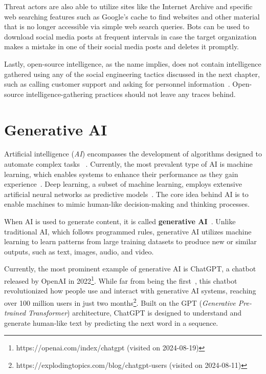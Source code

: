 Threat actors are also able to utilize sites like the Internet Archive and specific web searching features such as Google’s cache to find websites and other material that is no longer accessible via simple web search queries. Bots can be used to download social media posts at frequent intervals in case the target organization makes a mistake in one of their social media posts and deletes it promptly.

Lastly, open-source intelligence, as the name implies, does not contain intelligence gathered using any of the social engineering tactics discussed in the next chapter, such as calling customer support and asking for personnel information~\citep{hadnagy_Social_Engineering_The_Science_2018}. Open-source intelligence-gathering practices should not leave any traces behind.





\section{Generative AI}

Artificial intelligence (\textit{AI}) encompasses the development of algorithms designed to automate complex tasks ~\citep{mirsky_Threat_Offensive_AI_Organizations_2023}. Currently, the most prevalent type of AI is machine learning, which enables systems to enhance their performance as they gain experience~\citep{fakhouri_AI_Driven_Solutions_SE_Attacks_2024}. Deep learning, a subset of machine learning, employs extensive artificial neural networks as predictive models~\citep{goodfellow_Generative_Adversarial_Networks_2020}. The core idea behind AI is to enable machines to mimic human-like decision-making and thinking processes.


When AI is used to generate content, it is called \textbf{generative AI}~\citep{goodfellow_Generative_Adversarial_Networks_2020}. Unlike traditional AI, which follows programmed rules, generative AI utilizes machine learning to learn patterns from large training datasets to produce new or similar outputs, such as text, images, audio, and video.

Currently, the most prominent example of generative AI is ChatGPT, a chatbot released by OpenAI in 2022\footnote{https://openai.com/index/chatgpt (visited on 2024-08-19)}. While far from being the first~\citep{weizenbaum_ELIZA_1996}, this chatbot revolutionized how people use and interact with generative AI systems, reaching over 100 million users in just two months\footnote{https://explodingtopics.com/blog/chatgpt-users (visited on 2024-08-11)}. Built on the GPT (\textit{Generative Pre-trained Transformer}) architecture, ChatGPT is designed to understand and generate human-like text by predicting the next word in a sequence.

